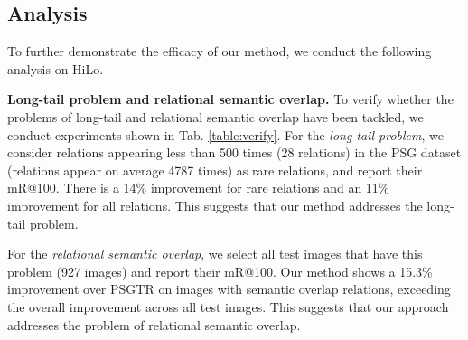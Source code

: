 \subsection{Analysis}
\label{exp:analysis}
To further demonstrate the efficacy of our method, we conduct the following analysis on HiLo.

\noindent \textbf{Long-tail problem and relational semantic overlap.}
To verify whether the problems of long-tail and relational semantic overlap have been tackled, we conduct experiments shown in Tab. \ref{table:verify}.
For the \textit{long-tail problem}, we consider relations appearing less than 500 times (28 relations) in the PSG dataset (relations appear on average 4787 times) as rare relations, and report their mR@100.
There is a 14\% improvement for rare relations and an 11\% improvement for all relations.
This suggests that our method addresses the long-tail problem.

For the \textit{relational semantic overlap}, we select all test images that have this problem (927 images) and report their mR@100.
Our method shows a 15.3\% improvement over PSGTR on images with semantic overlap relations, exceeding the overall improvement across all test images.
This suggests that our approach addresses the problem of relational semantic overlap.
\begin{table}\small
    \centering
{}
    \vspace{+1mm}
    \caption{Verification of the improvements in the long-tail problem and relational semantic overlap.
    \textit{All} refers to testing on the whole test set.
    \textit{Rare} refers to testing only on rare relations.
    \textit{Overlap} refers to testing only on data with relation semantic overlap.}
    \vspace{-4mm}
    \label{table:verify}
\end{table}






